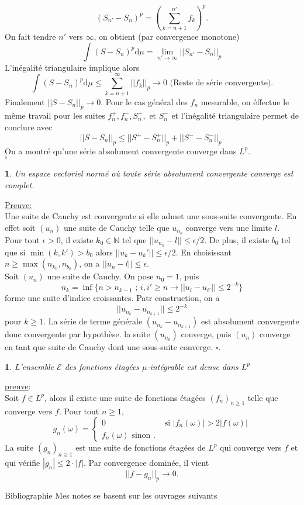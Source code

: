 \documentclass[8pt,notheorems]{beamer}
\def \N{\mathbb N}
\newtheorem{theorem}{\translate{Theorem}}[section]
\newtheorem{theorem}{\translate{Theoreme}}
\newtheorem{lemma}{\translate{Lemme}}
\theoremstyle{definition}
\theoremstyle{example}
\theoremstyle{mystyle}
\theoremstyle{plain}
\begin{document}
\begin{frame}[allowframebreaks]
$$
(S_{n'}-S_n)^p=\left(\sum_{k=n+1}^{n'}f_k\right)^p.
$$
On fait tendre $n'$ vers $\infty$, on obtient (par convergence monotone)
$$
\int(S-S_n)^p\text{d}\mu=\underset{n'\rightarrow\infty}{\lim}||S_{n'}-S_n||_p
$$
L'inégalité triangulaire implique alors
$$
\int(S-S_n)^p\text{d}\mu\leq \sum_{k = n+1}^\infty||f_k||_p\rightarrow 0 \text{ (Reste de série convergente).}
$$
Finalement $||S-S_n||_p\rightarrow 0$. Pour le cas général des $f_n$ mesurable, on éffectue le même travail pour les suites $f_n^+, f_n^-, S_n^+,$ et $S_n^-$ et l'inégalité triangulaire permet de conclure avec 
$$
||S-S_n||_p\leq||S^+-S_n^+||_p +||S^- -S_n^-||_p. 
$$
On a montré qu'une série absolument convergente converge dans $L^p$. \\
$\square$
\begin{lemma}
Un espace vectoriel normé où toute série absolument convergente converge est complet. 
\end{lemma}
\underline{Preuve:}\\
Une suite de Cauchy est convergente si elle admet une sous-suite convergente. En effet soit $(u_n)$ une suite de Cauchy telle que $u_{n_k}$ converge vers une limite $l$. Pour tout $\epsilon >0$, il existe $k_0\in\N$ tel que $||u_{n_k} -l||\leq \epsilon / 2$. De plus, il existe $b_0$ tel que si $\min(k,k')> b_0$ alors $||u_k - u_k'||\leq \epsilon/2$. En choisissant $n\geq\max(n_{k_0}, n_{b_0})$, on a $||u_n - l||\leq \epsilon$.\\

Soit $(u_n)$ une suite de Cauchy. On pose $n_0 = 1$, puis 
$$
n_k = \inf\{n>n_{k-1}\text{ ; }i,i'\geq n\rightarrow ||u_i - u_{i'}||\leq 2^{-k}\}
$$
forme une suite d'indice croissantes. Patr construction, on a 
$$
||u_{n_k} - u_{n_{k+1}}||\leq 2^{-k}
$$
pour $k\geq 1$. La série de terme générale $(u_{n_k} - u_{n_{k+1}})$ est absolument convergente donc convergente par hypothèse. la suite $(u_{n_k})$ converge, puis $(u_n)$ converge en tant que suite de Cauchy dont une sous-suite converge. 
$\square$.
\end{frame}
\begin{frame}[allowframebreaks]
\begin{theorem}
L'ensemble $\mathcal{E}$ des fonctions étagées $\mu$-intégrable est dense dans $L^p$
\end{theorem}
\underline{preuve}:\\
Soit $f\in L^p$, alors il existe une suite de fonctions étagées $(f_n)_{n\geq1}$ telle que  converge vers $f$. Pour tout $n\geq1$, 
$$
g_n(\omega) = \begin{cases}
0&\text{ si }|f_n(\omega)|>2|f(\omega)|\\
f_n(\omega)\text{ sinon }.
\end{cases}
$$
La suite $(g_n)_{n\geq1}$ est une suite de fonctions étagées de $L^p$ qui converge vers $f$ et qui vérifie $|g_n|\leq 2\cdot |f|$.  Par convergence dominée, il vient
$$
||f-g_n||_p\rightarrow 0.
$$
\end{frame}

\begin{frame}[allowframebreaks]{Bibliographie}
Mes notes se basent sur les ouvrages suivants \cite{BaLe07,Ga97,GaHe13,GaKu11,Ca09,le2006integration}


 \end{frame}
\end{document}
